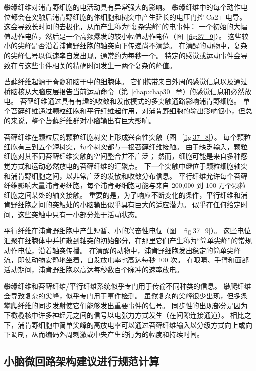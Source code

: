 攀缘纤维对浦肯野细胞的电活动具有异常强大的影响。
攀缘纤维中的每个动作电位都会在突触后浦肯野细胞的体细胞和树突中产生延长的电压门控 Ca2+ 电导。
这会导致长时间的去极化，从而产生称为“复杂尖峰”的电事件：
一个初始的大幅值动作电位，然后是一个高频爆发的较小幅值动作电位（图~\ref{fig:37_9}）。
这些较小的尖峰是否沿着浦肯野细胞的轴突向下传递尚不清楚。
在清醒的动物中，复杂的尖峰信号以低速率自发出现，通常约为每秒一个。
特定的感觉或运动事件会导致在与这些事件相关的精确时间发生一两个复杂的峰值。


苔藓纤维起源于脊髓和脑干中的细胞体。
它们携带来自外周的感觉信息以及通过桥脑核从大脑皮层报告当前运动命令（第~\ref{chap:chap30}~章）的感觉信息和必然放电。
苔藓纤维通过具有有趣的收敛和发散模式的多突触通路影响浦肯野细胞。
单个苔藓纤维通过颗粒细胞和平行纤维起作用，对浦肯野细胞的输出影响很小，但总的来说，整个苔藓纤维群对小脑输出有巨大影响。


苔藓纤维在颗粒层的颗粒细胞树突上形成兴奋性突触（图 ~\ref{fig:37_8}）。
每个颗粒细胞有三到五个短树突，每个树突都与一根苔藓纤维接触。
由于缺乏输入，颗粒细胞对其不同苔藓纤维突触的空间整合并不广泛；
然而，细胞可能是来自多种感觉方式和运动必然放电的苔藓纤维的汇聚点。
下一个突触中继位于颗粒细胞轴突和浦肯野细胞之间，以非常广泛的发散和收敛分布信息。
平行纤维允许每个苔藓纤维影响大量浦肯野细胞，每个浦肯野细胞可能与来自 200,000 到 100 万个颗粒细胞之间某处的轴突接触。
重要的是，为了响应不断变化的条件，平行纤维和浦肯野细胞之间的突触处的小脑输出似乎具有巨大的适应潜力。
似乎在任何给定时间，这些突触中只有一小部分处于活动状态。


平行纤维在浦肯野细胞中产生短暂、小的兴奋性电位（图 ~\ref{fig:37_9}）。
这些电位汇聚在细胞体中并扩散到轴突的初始部分，在那里它们产生称为“简单尖峰”的常规动作电位，沿着轴突传播。
在清醒的动物中，浦肯野细胞发出稳定的简单尖峰流，即使动物安静地坐着，自发放电率也高达每秒 100 次。
在眼睛、手臂和面部活动期间，浦肯野细胞以高达每秒数百个脉冲的速率放电。


攀缘纤维和苔藓纤维/平行纤维系统似乎专门用于传输不同种类的信息。
攀爬纤维会导致复杂的尖峰，似乎专门用于事件检测。
虽然复杂的尖峰很少出现，但多条攀爬纤维的同步发射使它们能够发出重要事件的信号。
同步性的出现部分是因为下橄榄核中许多神经元之间的信号以电张力方式发生（在间隙连接通道）。
相比之下，浦肯野细胞中简单尖峰的高放电率可以通过苔藓纤维输入以分级方式向上或向下调制，从而编码外周刺激或中央产生的行为的幅度和持续时间。



\subsection{小脑微回路架构建议进行规范计算}

